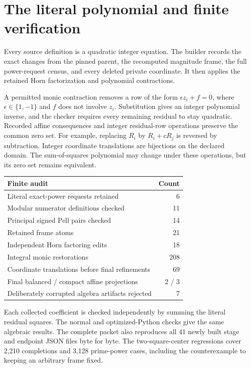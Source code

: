 \documentclass[11pt]{article}
\theoremstyle{remark}\newtheorem{remark}[theorem]{Remark}
\begin{document}
\section{The literal polynomial and finite verification}

Every source definition is a quadratic integer equation. The builder
records the exact changes from the pinned parent, the recomputed
magnitude frame, the full power-request census, and every deleted
private coordinate. It then applies the retained Horn factorization
and polynomial contractions.

A permitted monic contraction removes a row of the form
$\epsilon z_i+f=0$, where $\epsilon\in\{1,-1\}$ and $f$ does
not involve $z_i$. Substitution gives an integer polynomial inverse,
and the checker requires every remaining residual to stay quadratic.
Recorded affine consequences and integer residual-row operations
preserve the common zero set. For example, replacing $R_i$ by
$R_i+cR_j$ is reversed by subtraction. Integer coordinate translations
are bijections on the declared domain. The sum-of-squares polynomial
may change under these operations, but its zero set remains equivalent.

\begin{center}\small
\begin{tabular}{@{}lr@{}}
\toprule Finite audit & Count \\ \midrule
Literal exact-power requests retained & 6 \\
Modular numerator definitions checked & 11 \\
Principal signed Pell pairs checked & 14 \\
Retained frame atoms & 21 \\
Independent Horn factoring edits & 18 \\
Integral monic restorations & 208 \\
Coordinate translations before final refinements & 69 \\
Final balanced / compact affine projections & 2 / 3 \\
Deliberately corrupted algebra artifacts rejected & 7 \\
\bottomrule\end{tabular}\end{center}
Each collected coefficient is checked independently by summing the literal residual squares.
The normal and optimized-Python checks give the same algebraic results.
The complete packet also reproduces all 41 newly built stage and endpoint JSON files byte for byte.
The two-square-center regressions cover 2,210 completions and 3,128 prime-power cases,
including the counterexample to keeping an arbitrary frame fixed.
\end{document}
